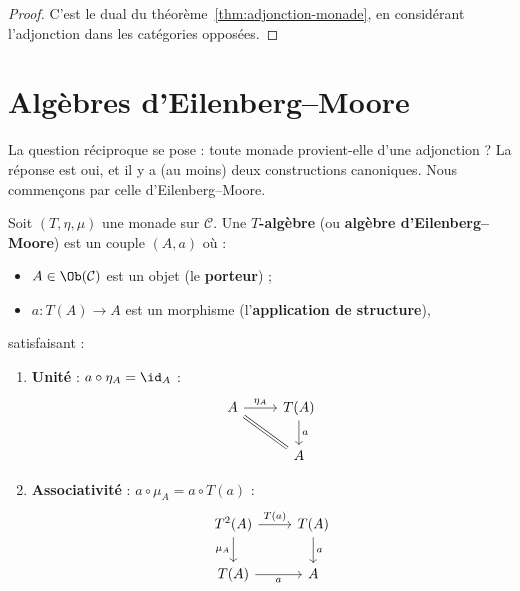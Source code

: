 \begin{proof}
C'est le dual du théorème~\ref{thm:adjonction-monade}, en considérant
l'adjonction dans les catégories opposées.
\end{proof}


\section{Algèbres d'Eilenberg--Moore}\label{sec:eilenberg-moore}

La question réciproque se pose : toute monade provient-elle d'une adjonction ?
La réponse est oui, et il y a (au moins) deux constructions canoniques.
Nous commençons par celle d'Eilenberg--Moore.

\begin{definition}[$T$-algèbre]\label{def:T-algebre}
Soit $(T, \eta, \mu)$ une monade sur $\mathcal{C}$.
Une \textbf{$T$-algèbre} (ou \textbf{algèbre d'Eilenberg--Moore})
est un couple $(A, a)$ où :
\begin{itemize}
    \item $A \in \Ob(\mathcal{C})$ est un objet (le \textbf{porteur}) ;
    \item $a \colon T(A) \to A$ est un morphisme
    (l'\textbf{application de structure}),
\end{itemize}
satisfaisant :
\begin{enumerate}[label=(\roman*)]
\item \textbf{Unité} :
    $a \circ \eta_A = \id_A$ :
\[
\begin{tikzcd}
A \arrow[r, "\eta_A"] \arrow[dr, equal] & T(A) \arrow[d, "a"] \\
& A
\end{tikzcd}
\]

\item \textbf{Associativité} :
    $a \circ \mu_A = a \circ T(a)$ :
\[
\begin{tikzcd}
T^2(A) \arrow[r, "T(a)"] \arrow[d, "\mu_A"'] & T(A) \arrow[d, "a"] \\
T(A) \arrow[r, "a"'] & A
\end{tikzcd}
\]
\end{enumerate}
\end{definition}

